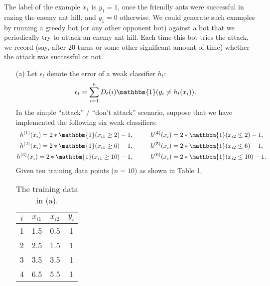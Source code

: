 \documentclass[10pt]{article}
\begin{document}
\begin{enumerate}[1.]
	    The label of the example $x_{1}$ is $y_{1} = 1$, once the friendly ants were successful in razing the enemy ant hill, and $y_{1} = 0$ otherwise. We could generate such examples by running a greedy bot (or any other opponent bot) against a bot that we periodically try to attack an enemy ant hill. Each time this bot tries the attack, we record (say, after $20$ turns or some other significant amount of time) whether the attack was successful or not.

	    \begin{itemize}
            \item[(a)] Let $\epsilon_t$ denote the error of a weak classifier $h_t$:
		        \begin{equation}
		            \epsilon_{t} = \sum_{i=1}^{n} D_{t}(i) \mathbbm{1}(y_{i} \neq h_{t}(x_{i})).
		        \end{equation}
		        In the simple “attack” / “don't attack” scenario, suppose that we have implemented the following six weak classifiers:
		        \begin{align*}
		            h^{(1)}(x_{i}) = 2 * \mathbbm{1}(x_{i1} \geq 2) - 1, \hspace{1cm}  & h^{(4)}(x_{i}) = 2 * \mathbbm{1}(x_{i2} \leq 2) - 1,  \\
			        h^{(2)}(x_{i}) = 2 * \mathbbm{1}(x_{i1} \geq 6) - 1, \hspace{1cm}  & h^{(5)}(x_{i}) = 2 * \mathbbm{1}(x_{i2} \leq 6) - 1,  \\
			        h^{(3)}(x_{i}) = 2 * \mathbbm{1}(x_{i1} \geq 10) - 1, \hspace{1cm} & h^{(6)}(x_{i}) = 2 * \mathbbm{1}(x_{i2} \leq 10) - 1. \\
		        \end{align*}
		        Given ten training data points ($n = 10$) as shown in Table 1,
		        \begin{table}[t]
                    \caption{The training data in (a).}
                    \label{table1}
                    \centering
                    \begin{tabular}{|c|cc|c|}
                    \hline
                    $i$ & $x_{i1}$ & $x_{i2}$ & $y_{i}$ \\ \hline
                    1 & 1.5 & 0.5 & 1 \\
                    2 & 2.5 & 1.5 & 1 \\
                    3 & 3.5 & 3.5 & 1 \\
                    4 & 6.5 & 5.5 & 1 \\

\end{tabular}
\end{table}
\end{itemize}
\end{enumerate}
\end{document}
